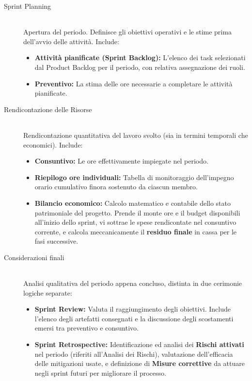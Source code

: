 \documentclass[a4paper, 11pt, oneside]{scrartcl} %
\begin{document}
\begin{description}
    \item[Sprint Planning] \hfill \\
    Apertura del periodo. Definisce gli obiettivi operativi e le stime prima dell'avvio delle attività. Include:
    \begin{itemize}
        \item \textbf{Attività pianificate (Sprint Backlog):} L'elenco dei task selezionati dal Product Backlog per il periodo, con relativa assegnazione dei ruoli.
        \item \textbf{Preventivo:} La stima delle ore necessarie a completare le attività pianificate.
    \end{itemize}

    \item[Rendicontazione delle Risorse] \hfill \\
    Rendicontazione quantitativa del lavoro svolto (sia in termini temporali che economici). Include:
    \begin{itemize}
        \item \textbf{Consuntivo:} Le ore effettivamente impiegate nel periodo.
        \item \textbf{Riepilogo ore individuali:} Tabella di monitoraggio dell'impegno orario cumulativo finora sostenuto da ciascun membro.
        \item \textbf{Bilancio economico:} Calcolo matematico e contabile dello stato patrimoniale del progetto. Prende il monte ore e il budget disponibili all'inizio dello sprint, vi sottrae le spese rendicontate nel consuntivo corrente, e calcola meccanicamente il \textbf{residuo finale} in cassa per le fasi successive.
    \end{itemize}

    \item[Considerazioni finali] \hfill \\
    Analisi qualitativa del periodo appena concluso, distinta in due cerimonie logiche separate:
    \begin{itemize}
        \item \textbf{Sprint Review:} Valuta il raggiungimento degli obiettivi. Include l'elenco degli artefatti consegnati e la discussione degli scostamenti emersi tra preventivo e consuntivo.
        \item \textbf{Sprint Retrospective:} Identificazione ed analisi dei \textbf{Rischi attivati} nel periodo (riferiti all'Analisi dei Rischi), valutazione dell'efficacia delle mitigazioni usate, e definizione di \textbf{Misure correttive} da attuare negli sprint futuri per migliorare il processo.
    \end{itemize}
\end{description}
\newpage
\end{document}

